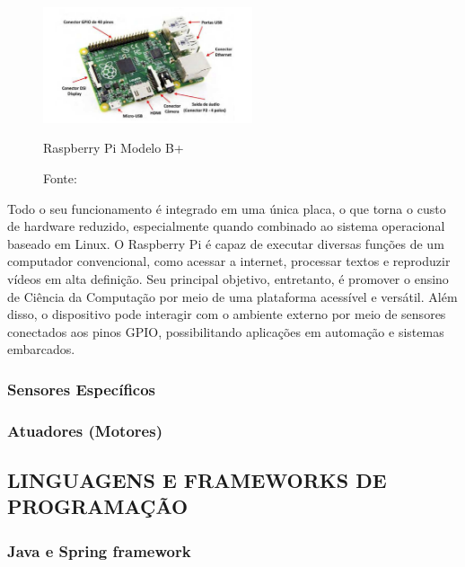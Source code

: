             \begin{figure}[H]
                \centering
                \caption{ }  
                \centering
                \label{fig:cont}
                \includegraphics[width=0.55\textwidth]{imagens/raspberry.png}
                \caption*{Raspberry Pi Modelo B+}
                \caption*{Fonte: \cite{juca2018aplicaccoes}}
            \end{figure}

            Todo o seu funcionamento é integrado em uma única placa, o que torna o custo de hardware reduzido, especialmente quando combinado ao sistema operacional baseado em Linux. O Raspberry Pi é capaz de executar diversas funções de um computador convencional, como acessar a internet, processar textos e reproduzir vídeos em alta definição.
            Seu principal objetivo, entretanto, é promover o ensino de Ciência da Computação por meio de uma plataforma acessível e versátil.
            Além disso, o dispositivo pode interagir com o ambiente externo por meio de sensores conectados aos pinos GPIO, possibilitando aplicações em automação e sistemas embarcados.

        \subsubsection*{Sensores Específicos}

        \subsubsection*{Atuadores (Motores)} 
    
    \subsection{LINGUAGENS E FRAMEWORKS DE PROGRAMAÇÃO}

        \subsubsection*{Java e Spring framework}

